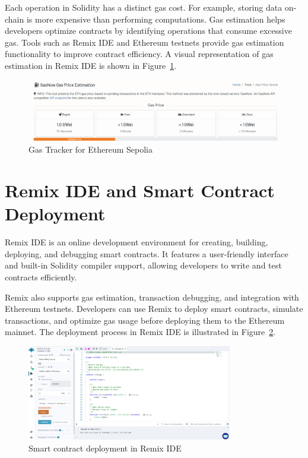 \documentclass[a4paper,12pt]{report}
\begin{document}
 Each operation in Solidity has a distinct gas cost. For example, storing data on-chain is more expensive than performing computations. Gas estimation helps developers optimize contracts by identifying operations that consume excessive gas. Tools such as Remix IDE and Ethereum testnets provide gas estimation functionality to improve contract efficiency. A visual representation of gas estimation in Remix IDE is shown in Figure~\ref{fig:gas_estimation}.
 
 \begin{figure}[H]
 \centering
 \includegraphics[width=1\textwidth]{gas price.PNG}
 \caption{Gas Tracker for Ethereum Sepolia}
 \label{fig:gas_estimation}
 \end{figure}
 
 \section{Remix IDE and Smart Contract Deployment}
 Remix IDE is an online development environment for creating, building, deploying, and debugging smart contracts. It features a user-friendly interface and built-in Solidity compiler support, allowing developers to write and test contracts efficiently.
 
 Remix also supports gas estimation, transaction debugging, and integration with Ethereum testnets. Developers can use Remix to deploy smart contracts, simulate transactions, and optimize gas usage before deploying them to the Ethereum mainnet. The deployment process in Remix IDE is illustrated in Figure~\ref{fig:remix_deployment}.
 
 \begin{figure}[H]
 \centering
 \includegraphics[width=0.8\textwidth]{remix ide.PNG}
 \caption{Smart contract deployment in Remix IDE}
 \label{fig:remix_deployment}
 \end{figure}
\end{document}
